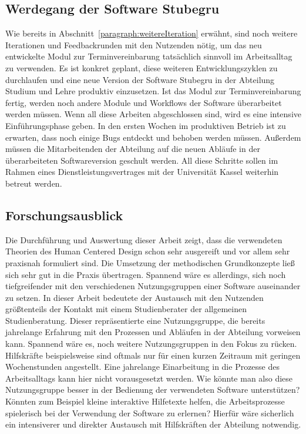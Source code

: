 \subsection*{Werdegang der Software Stubegru}
Wie bereits in Abschnitt~\ref{paragraph:weitereIteration} erwähnt, sind noch
weitere Iterationen und Feedbackrunden mit den Nutzenden nötig, um das neu
entwickelte Modul zur Terminvereinbarung tatsächlich sinnvoll im Arbeitsalltag
zu verwenden. Es ist konkret geplant, diese weiteren Entwicklungszyklen zu
durchlaufen und eine neue Version der Software Stubegru in der Abteilung
Studium und Lehre produktiv einzusetzen. Ist das Modul zur Terminvereinbarung
fertig, werden noch andere Module und Workflows der Software überarbeitet
werden müssen. Wenn all diese Arbeiten abgeschlossen sind, wird es eine
intensive Einführungsphase geben. In den ersten Wochen im produktiven Betrieb
ist zu erwarten, dass noch einige Bugs entdeckt und behoben werden müssen.
Außerdem müssen die Mitarbeitenden der Abteilung auf die neuen Abläufe in der
überarbeiteten Softwareversion geschult werden. All diese Schritte sollen im
Rahmen eines Dienstleistungsvertrages mit der Universität Kassel weiterhin
betreut werden.

\subsection*{Forschungsausblick}
Die Durchführung und Auswertung dieser Arbeit zeigt, dass die verwendeten
Theorien des Human Centered Design schon sehr ausgereift und vor allem sehr
praxisnah formuliert sind. Die Umsetzung der methodischen Grundkonzepte ließ
sich sehr gut in die Praxis übertragen. Spannend wäre es allerdings, sich
noch tiefgreifender mit den verschiedenen Nutzungsgruppen einer Software
auseinander zu setzen. In dieser Arbeit bedeutete der Austausch mit den
Nutzenden größtenteils der Kontakt mit einem Studienberater der allgemeinen
Studienberatung. Dieser repräsentierte eine Nutzungsgruppe, die bereits
jahrelange Erfahrung mit den Prozessen und Abläufen in der Abteilung vorweisen
kann. Spannend wäre es, noch weitere Nutzungsgruppen in den Fokus zu rücken.
Hilfskräfte beispielsweise sind oftmals nur für einen kurzen Zeitraum mit
geringen Wochenstunden angestellt. Eine jahrelange Einarbeitung in die Prozesse
des Arbeitsalltags kann hier nicht vorausgesetzt werden. Wie könnte man also
diese Nutzungsgruppe besser in der Bedienung der verwendeten Software
unterstützen? Könnten zum Beispiel kleine interaktive Hilfetexte helfen, die
Arbeitsprozesse spielerisch bei der Verwendung der Software zu erlernen?
Hierfür wäre sicherlich ein intensiverer und direkter Austausch mit
Hilfskräften der Abteilung notwendig.

